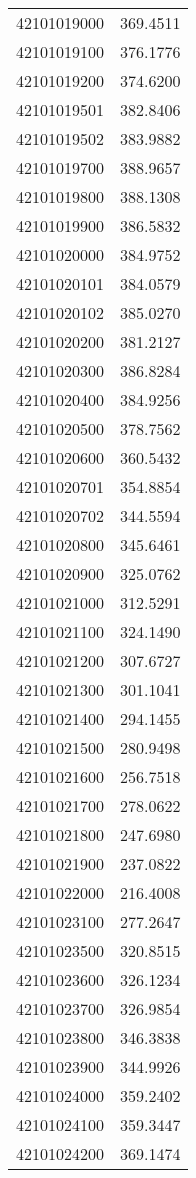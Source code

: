 \begin{longtable}[t]{lr}
42101019000 & 369.4511\\
42101019100 & 376.1776\\
42101019200 & 374.6200\\
42101019501 & 382.8406\\
42101019502 & 383.9882\\
42101019700 & 388.9657\\
42101019800 & 388.1308\\
42101019900 & 386.5832\\
42101020000 & 384.9752\\
42101020101 & 384.0579\\
42101020102 & 385.0270\\
42101020200 & 381.2127\\
42101020300 & 386.8284\\
42101020400 & 384.9256\\
42101020500 & 378.7562\\
42101020600 & 360.5432\\
42101020701 & 354.8854\\
42101020702 & 344.5594\\
42101020800 & 345.6461\\
42101020900 & 325.0762\\
42101021000 & 312.5291\\
42101021100 & 324.1490\\
42101021200 & 307.6727\\
42101021300 & 301.1041\\
42101021400 & 294.1455\\
42101021500 & 280.9498\\
42101021600 & 256.7518\\
42101021700 & 278.0622\\
42101021800 & 247.6980\\
42101021900 & 237.0822\\
42101022000 & 216.4008\\
42101023100 & 277.2647\\
42101023500 & 320.8515\\
42101023600 & 326.1234\\
42101023700 & 326.9854\\
42101023800 & 346.3838\\
42101023900 & 344.9926\\
42101024000 & 359.2402\\
42101024100 & 359.3447\\
42101024200 & 369.1474\\

\end{longtable}
